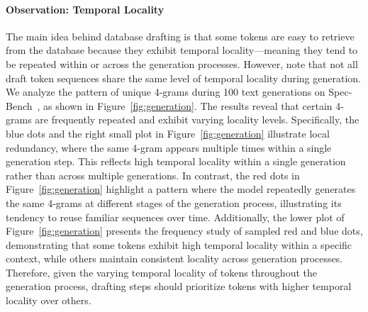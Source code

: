 \paragraph{Observation: Temporal Locality}
The main idea behind database drafting is that some tokens are easy to retrieve from the database because they exhibit temporal locality—meaning they tend to be repeated within or across the generation processes. 
However, note that not all draft token sequences share the same level of temporal locality during generation. 
We analyze the pattern of unique 4-grams during 100 text generations on Spec-Bench~\cite{Spec_Survey}, as shown in Figure~\ref{fig:generation}. The results reveal that certain 4-grams are frequently repeated and exhibit varying locality levels.
Specifically, the blue dots and the right small plot in Figure~\ref{fig:generation} illustrate local redundancy, where the same 4-gram appears multiple times within a single generation step. This reflects high temporal locality within a single generation rather than across multiple generations. In contrast, the red dots in Figure~\ref{fig:generation} highlight a pattern where the model repeatedly generates the same 4-grams at different stages of the generation process, illustrating its tendency to reuse familiar sequences over time.
Additionally, the lower plot of Figure~\ref{fig:generation} presents the frequency study of sampled red and blue dots, demonstrating that some tokens exhibit high temporal locality within a specific context, while others maintain consistent locality across generation processes.
Therefore, given the varying temporal locality of tokens throughout the generation process, drafting steps should prioritize tokens with higher temporal locality over others.


